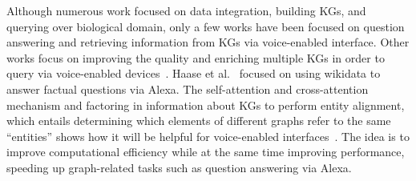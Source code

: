 \documentclass[10pt,journal,compsoc]{IEEEtran}
\begin{document}

Although numerous work focused on data integration, building KGs, and querying over biological domain, only a few works have been focused on question answering and retrieving information from KGs via voice-enabled interface. Other works focus on improving the quality and enriching multiple KGs in order to query via voice-enabled devices~\cite{10.1145/3366423.3380289}. Haase et al.~\cite{Haase2017AlexaAW} focused on using wikidata to answer factual questions via Alexa. The self-attention and cross-attention mechanism and factoring in information about KGs to perform entity alignment, which entails determining which elements of different graphs refer to the same ``entities'' shows how it will be helpful for voice-enabled interfaces~\cite{amazonscience}. The idea is to improve computational efficiency while at the same time improving performance, speeding up graph-related tasks such as question answering via Alexa.

\end{document}

